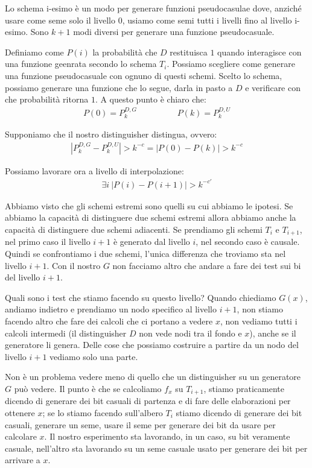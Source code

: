 Lo schema i-esimo è un modo per generare funzioni pseudocasulae dove, anziché usare come seme solo il livello 0, usiamo come semi tutti i livelli fino al livello i-esimo. Sono $k+1$ modi diversi per generare una funzione pseudocasuale.

Definiamo come $P(i)$ la probabilità che $D$ restituisca $1$ quando interagisce con una funzione geenrata secondo lo schema $T_i$. Possiamo scegliere come generare una funzione pseudocasuale con ognuno di questi schemi. Scelto lo schema, possiamo generare una funzione che lo segue, darla in pasto a $D$ e verificare con che probabilità ritorna $1$. A questo punto è chiaro che:
\begin{align*}
    P(0) = P_k^{D, G} \hspace{2cm} P(k) = P_k^{D, U}
\end{align*}

\noindent Supponiamo che il nostro distinguisher distingua, ovvero:
\begin{align*}
    \left|P_k^{D, G} - P_k^{D, U} \right| > k^{-c} = \left|P(0) - P(k) \right| > k^{-c}
\end{align*}

\noindent Possiamo lavorare ora a livello di interpolazione:
\begin{align*}
    \exists i \ \left| P(i) - P(i+1) \right| > k^{-c'}
\end{align*}

\noindent Abbiamo visto che gli schemi estremi sono quelli su cui abbiamo le ipotesi. Se abbiamo la capacità di distinguere due schemi estremi allora abbiamo anche la capacità di distinguere due schemi adiacenti. Se prendiamo gli schemi $T_i$ e $T_{i+1}$, nel primo caso il livello $i+1$ è generato dal livello $i$, nel secondo caso è causale. Quindi se confrontiamo i due schemi, l'unica differenza che troviamo sta nel livello $i+1$. Con il nostro $G$ non facciamo altro che andare a fare dei test sui bi del livello $i+1$.

Quali sono i test che stiamo facendo su questo livello? Quando chiediamo $G(x)$, andiamo indietro e prendiamo un nodo specifico al livello $i+1$, non stiamo facendo altro che fare dei calcoli che ci portano a vedere $x$, non vediamo tutti i calcoli intermedi (il distinguisher $D$ non vede nodi tra il fondo e $x$), anche se il generatore li genera. Delle cose che possiamo costruire a partire da un nodo del livello $i+1$ vediamo solo una parte.

Non è un problema vedere meno di quello che un distinguisher su un generatore $G$ può vedere. Il punto è che se calcoliamo $f_x$ su $T_{i+1}$, stiamo praticamente dicendo di generare dei bit casuali di partenza e di fare delle elaborazioni per ottenere $x$; se lo stiamo facendo sull'albero $T_i$ stiamo dicendo di generare dei bit casuali, generare un seme, usare il seme per generare dei bit da usare per calcolare $x$. Il nostro esperimento sta lavorando, in un caso, su bit veramente casuale, nell'altro sta lavorando su un seme casuale usato per generare dei bit per arrivare a $x$.

